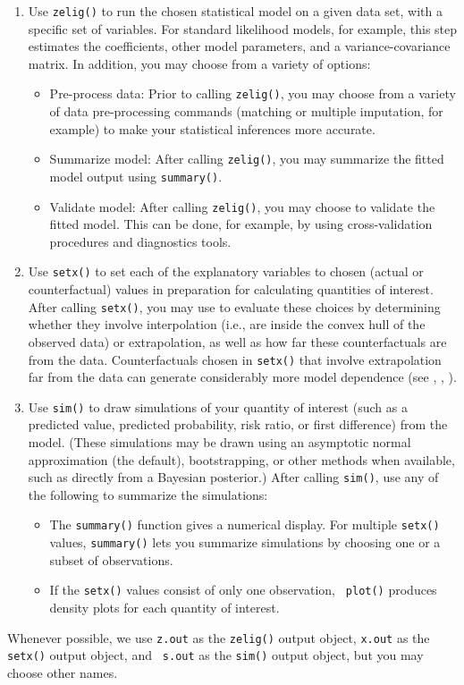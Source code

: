 \begin{enumerate}
\item Use \texttt{zelig()} to run the chosen statistical model on a
given data set, with a specific set of variables.  For standard
likelihood models, for example, this step estimates the coefficients,
other model parameters, and a variance-covariance matrix.  In
addition, you may choose from a variety of options:
\begin{itemize} 
\item Pre-process data:  Prior to calling {\tt zelig()}, you may
  choose from a variety of data pre-processing commands (matching or
  multiple imputation, for example) to make your statistical
  inferences more accurate. 
\item Summarize model: After calling {\tt zelig()}, you may summarize
  the fitted model output using {\tt summary()}.
\item Validate model: After calling {\tt zelig()}, you may choose to
  validate the fitted model. This can be done, for example, by using
  cross-validation procedures and diagnostics tools.
\end{itemize}
\item Use \texttt{setx()} to set each of the explanatory variables to
  chosen (actual or counterfactual) values in preparation for
  calculating quantities of interest.  After calling {\tt setx()}, you
  may use  to evaluate these choices by
  determining whether they involve interpolation (i.e., are inside the
  convex hull of the observed data) or extrapolation, as well as how
  far these counterfactuals are from the data.  Counterfactuals chosen
  in \texttt{setx()} that involve extrapolation far from the data can
  generate considerably more model dependence (see \cite{KinZen06a},
  \cite{KinZen06b}, \cite{StoKinZen06}).
\item Use \texttt{sim()} to draw simulations of your quantity of
  interest (such as a predicted value, predicted probability, risk
  ratio, or first difference) from the model.  (These simulations may
  be drawn using an asymptotic normal approximation (the default),
  bootstrapping, or other methods when available, such as directly
  from a Bayesian posterior.)  After calling {\tt sim()}, use any of
the following to summarize the simulations:
\begin{itemize}
\item The {\tt summary()} function gives a numerical display. For
multiple {\tt setx()} values, {\tt summary()} lets you summarize
simulations by choosing one or a subset of observations.
\item If the {\tt setx()} values consist of only one observation, {\tt
plot()} produces density plots for each quantity of interest.  
\end{itemize}
\end{enumerate}
Whenever possible, we use {\tt z.out} as the {\tt zelig()} output
object, \texttt{x.out} as the \texttt{setx()} output object, and {\tt
s.out} as the {\tt sim()} output object, but you may choose other
names.

